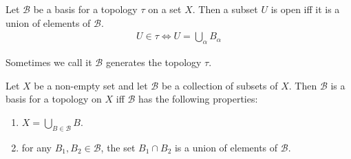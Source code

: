 \begin{proposition}{}{}
    Let $\mathcal{B}$ be a basis for a topology $\tau$ on a set $X$.
    Then a subset $U$ is open iff it is a union of elements of
    $\mathcal{B}$.
    \begin{align*}
        U \in \tau \iff U = \bigcup_{\alpha} B_{\alpha}
    \end{align*}
\end{proposition}
Sometimes we call it $\mathcal{B}$ generates the topology $\tau$.

\begin{theorem}{}{}
    Let $X$ be a non-empty set and let $\mathcal{B}$ be a collection
    of subsets of $X$. Then
    $\mathcal{B}$ is a basis for a topology on $X$ iff $\mathcal{B}$
    has the following properties:
    \begin{enumerate}
        \item $X = \bigcup_{B \in \mathcal{B}} B$.
        \item for any $B_{1},B_{2} \in \mathcal{B}$, the set $B_{1}
            \cap B_{2}$ is a union of elements of $\mathcal{B}$.
    \end{enumerate}
\end{theorem}

